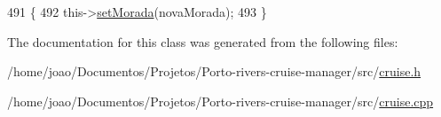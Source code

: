 \begin{DoxyCode}
491                                                \{
492     this->\hyperlink{classClienteInativo_aea3df2299f33ea2f4e22f406ba73d5b2}{setMorada}(novaMorada);
493 \}
\end{DoxyCode}


The documentation for this class was generated from the following files\+:\begin{DoxyCompactItemize}
\item 
/home/joao/\+Documentos/\+Projetos/\+Porto-\/rivers-\/cruise-\/manager/src/\hyperlink{cruise_8h}{cruise.\+h}\item 
/home/joao/\+Documentos/\+Projetos/\+Porto-\/rivers-\/cruise-\/manager/src/\hyperlink{cruise_8cpp}{cruise.\+cpp}\end{DoxyCompactItemize}
